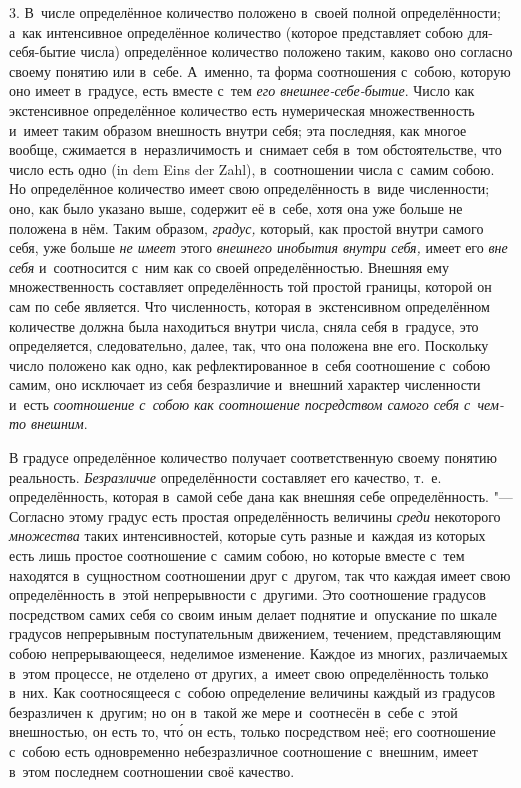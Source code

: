 3. В~числе определённое количество положено в~своей полной определённости;
а~как интенсивное определённое количество (которое представляет собою
для-себя-бытие числа) определённое количество положено таким, каково оно
согласно своему понятию или в~себе. А~именно, та форма соотношения с~собою,
которую оно имеет в~градусе, есть вместе с~тем
{\em его внешнее-себе-бытие}. Число как экстенсивное определённое количество есть нумерическая
множественность и~имеет таким образом внешность внутри себя; эта последняя, как
многое вообще, сжимается в~неразличимость и~снимает себя в~том обстоятельстве,
что число есть одно (in dem Eins der Zahl), в~соотношении числа с~самим собою.
Но определённое количество имеет свою определённость в~виде численности; оно,
как было указано выше, содержит её в~себе, хотя она уже больше не положена в
нём. Таким образом, {\em градус,} который, как простой внутри самого себя, уже
больше {\em не имеет} этого {\em внешнего инобытия внутри себя,} имеет его
{\em вне себя} и~соотносится с~ним как со своей определённостью. Внешняя ему
множественность составляет определённость той простой границы, которой он сам
по себе является. Что численность, которая в~экстенсивном определённом
количестве должна была находиться внутри числа, сняла себя в~градусе, это
определяется, следовательно, далее, так, что она положена вне его. Поскольку
число положено как одно, как рефлектированное в~себя соотношение с~собою самим,
оно исключает из себя безразличие и~внешний характер численности и~есть
{\em соотношение с~собою как соотношение посредством
самого себя с~чем-то внешним}.

В градусе определённое количество получает соответственную своему понятию
реальность. {\em Безразличие} определённости составляет его качество, т.~е.
определённость, которая в~самой себе дана как внешняя себе определённость. "---
Согласно этому градус есть простая определённость величины {\em среди}
некоторого {\em множества} таких интенсивностей, которые суть разные и~каждая
из которых есть лишь простое соотношение с~самим собою, но которые вместе с~тем
находятся в~сущностном соотношении друг с~другом, так что каждая имеет свою
определённость в~этой непрерывности с~другими. Это соотношение градусов
посредством самих себя со своим иным делает поднятие и~опускание по шкале
градусов непрерывным поступательным движением, течением, представляющим собою
непрерывающееся, неделимое изменение. Каждое из многих, различаемых в~этом
процессе, не отделено от других, а~имеет свою определённость только в~них. Как
соотносящееся с~собою определение величины каждый из градусов безразличен
к~другим; но он в~такой же мере и~соотнесён в~себе с~этой внешностью, он есть
то, чт\'{о} он есть, только посредством неё; его соотношение с~собою есть
одновременно небезразличное соотношение с~внешним, имеет в~этом последнем
соотношении своё качество.

